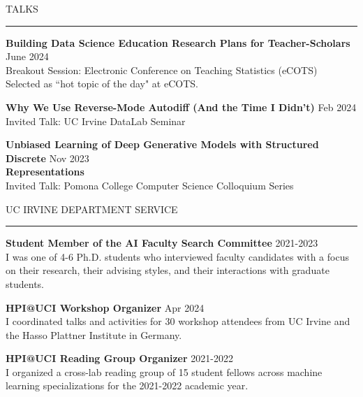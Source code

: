 \documentclass{resume} %
\renewenvironment{rSection}[1]{
\sectionskip
\textcolor{CarnegieMellonRed}{\MakeUppercase{#1}}
\sectionlineskip
\hrule
\begin{list}{}{
\setlength{\leftmargin}{1.5em}
}
\item[]
}{
\end{list}
}
\begin{document}
\begin{rSection}{Talks}	
{\bf Building Data Science Education Research Plans for Teacher-Scholars} \hfill { June 2024}\\
Breakout Session: Electronic Conference on Teaching Statistics (eCOTS)\\
Selected as ``hot topic of the day" at eCOTS. \vspace{1.em}


{\bf Why We Use Reverse-Mode Autodiff (And the Time I Didn't)} \hfill { Feb 2024}\\
Invited Talk: UC Irvine DataLab Seminar \vspace{1.em}

{\bf Unbiased Learning of Deep Generative Models with Structured Discrete } \hfill { Nov 2023}\\
{\bf  Representations}\\
Invited Talk: Pomona College Computer Science Colloquium Series\vspace{1.em}
\end{rSection}
\newpage
\begin{rSection}{UC Irvine Department Service}	
{\bf Student Member of the AI Faculty Search Committee} \hfill { 2021-2023}\\
I was one of 4-6 Ph.D. students who interviewed faculty candidates with a focus on their research, their advising styles, and their interactions with graduate students.
  \vspace{1.em}

{\bf HPI@UCI Workshop Organizer} \hfill { Apr 2024}\\
I coordinated talks and activities for 30 workshop attendees from UC Irvine and the Hasso Plattner Institute in Germany. \vspace{1.em}

{\bf HPI@UCI Reading Group Organizer} \hfill { 2021-2022}\\
I organized a cross-lab reading group of 15 student fellows across machine learning specializations for the 2021-2022 academic year. \vspace{1.em}

\end{rSection}
\end{document}
